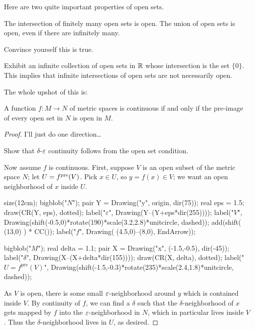 Here are two quite important properties of open sets.
\begin{proposition}
	\listhack
	\begin{enumerate}[(a)]
		\ii The intersection of finitely many open sets is open.
		\ii The union of open sets is open, even if there are infinitely many.
	\end{enumerate}
\end{proposition}
\begin{ques}
	Convince yourself this is true.
\end{ques}
\begin{exercise}
	Exhibit an infinite collection of open sets in $\mathbb R$
	whose intersection is the set $\{0\}$.
	This implies that infinite intersections of open sets are not necessarily open.
\end{exercise}

The whole upshot of this is:
\begin{theorem}
	\label{thm:open_set}
	A function $f \colon M \to N$ of metric spaces is continuous
	if and only if the pre-image of every open set in $N$ is open in $M$.
\end{theorem}
\begin{proof}
	I'll just do one direction\dots
	\begin{exercise}
		Show that $\delta$-$\varepsilon$ continuity follows from
		the open set condition.
	\end{exercise}
	Now assume $f$ is continuous.
	First, suppose $V$ is an open subset of the metric space $N$;
	let $U = f^{\text{pre}}(V)$. Pick $x \in U$, so $y = f(x) \in V$; we want an
	open neighborhood of $x$ inside $U$.

	\begin{center}
		\begin{asy}
			size(12cm);
			bigblob("$N$");
			pair Y = Drawing("y", origin, dir(75));
			real eps = 1.5;
			draw(CR(Y, eps), dotted);
			label("$\varepsilon$", Drawing(Y--(Y+eps*dir(255))));
			label("$V$",
				Drawing(shift(-0.5,0)*rotate(190)*scale(3.2,2.8)*unitcircle, dashed));
			add(shift( (13,0) ) * CC());
			label("$f$", Drawing( (4.5,0)--(8,0), EndArrow));

			bigblob("$M$");
			real delta = 1.1;
			pair X = Drawing("x", (-1.5,-0.5), dir(-45));
			label("$\delta$", Drawing(X--(X+delta*dir(155))));
			draw(CR(X, delta), dotted);
			label("$U = f^{\text{pre}}(V)$",
				Drawing(shift(-1.5,-0.3)*rotate(235)*scale(2.4,1.8)*unitcircle, dashed));
		\end{asy}
	\end{center}

	As $V$ is open, there is some small $\varepsilon$-neighborhood around $y$
	which is contained inside $V$.
	By continuity of $f$, we can find a $\delta$ such that the $\delta$-neighborhood
	of $x$ gets mapped by $f$ into the $\varepsilon$-neighborhood in $N$,
	which in particular lives inside $V$.
	Thus the $\delta$-neighborhood lives in $U$, as desired.
\end{proof}

